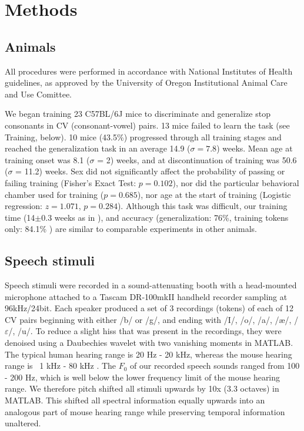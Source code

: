 \documentclass[preprint, NumberedRefs]{JASAnew}\usepackage[]{graphicx}\usepackage[]{color}
\begin{document}
\section{\Large Methods}

\subsection{Animals}

All procedures were performed in accordance with National Institutes of Health guidelines, as approved by the University of Oregon Institutional Animal Care and Use Comittee.

We began training 23 C57BL/6J mice to discriminate and generalize stop consonants in CV (consonant-vowel) pairs. 13 mice failed to learn the task (see Training, below). 10 mice (43.5\%) progressed through all training stages and reached the generalization task in an average 14.9 ($\sigma = 7.8$) weeks. Mean age at training onset was 8.1 ($\sigma$ = 2) weeks, and at discontinuation of training was 50.6 ($\sigma$ = 11.2) weeks. Sex did not significantly affect the probability of passing or failing training (Fisher's Exact Test: $p = 0.102$), nor did the particular behavioral chamber used for training ($p = 0.685$), nor age at the start of training (Logistic regression: $z = 1.071$, $p=0.284$). Although this task was difficult, our training time (14$\pm 0.3$ weeks as in \cite{Engineer2015}), and accuracy (generalization: 76\%\cite{Kluender1987}, training tokens only: 84.1\% \cite{Engineer2015}) are similar to comparable experiments in other animals.

\subsection{Speech stimuli}

Speech stimuli were recorded in a sound-attenuating booth with a head-mounted microphone attached to a Tascam DR-100mkII handheld recorder sampling at 96kHz/24bit. Each speaker produced a set of 3 recordings (tokens) of each of 12 CV pairs beginning with either /b/ or /g/, and ending with /I/, /o/, /a/, /\ae/, /$\varepsilon$/, /u/. To reduce a slight hiss that was present in the recordings, they were denoised using a Daubechies wavelet with two vanishing moments in MATLAB. The typical human hearing range is 20 Hz - 20 kHz, whereas the mouse hearing range is ~1 kHz - 80 kHz \cite{Radziwon2009}. The $F_0$ of our recorded speech sounds ranged from 100 - 200 Hz, which is well below the lower frequency limit of the mouse hearing range. We therefore pitch shifted all stimuli upwards by 10x (3.3 octaves) in MATLAB\cite{Mathworks}. This shifted all spectral information equally upwards into an analogous part of mouse hearing range while preserving temporal information unaltered.
\end{document}
